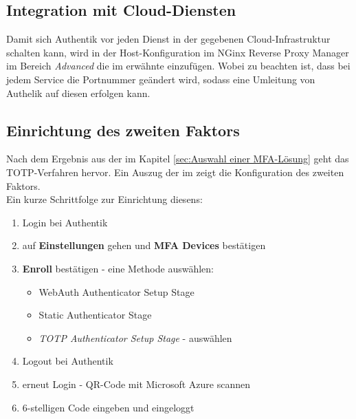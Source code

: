 \subsection{Integration mit Cloud-Diensten}
\label{sec:Integration mit Cloud-Diensten}
Damit sich Authentik vor jeden Dienst in der gegebenen Cloud-Infrastruktur schalten kann, wird in der Host-Konfiguration im NGinx Reverse 
Proxy Manager im Bereich \textit{Advanced} die im  erwähnte  einzufügen. Wobei zu beachten ist, 
dass bei jedem Service die Portnummer geändert wird, sodass eine Umleitung von Authelik auf diesen erfolgen kann.

\subsection{Einrichtung des zweiten Faktors}
\label{sec:Einrichtung des zweiten Faktors}
Nach dem Ergebnis aus der  im Kapitel \ref{sec:Auswahl einer MFA-Lösung}  
geht das \acs{TOTP}-Verfahren hervor. Ein Auszug der  im  zeigt die Konfiguration des 
zweiten Faktors.
\\Ein kurze Schrittfolge zur Einrichtung diesens:
\begin{enumerate}
    \item Login bei Authentik
    \item auf \textbf{Einstellungen} gehen und \textbf{\acs*{MFA} Devices} bestätigen
    \item \textbf{Enroll} bestätigen - eine Methode auswählen:
    \begin{itemize}
        \item WebAuth Authenticator Setup Stage
        \item Static Authenticator Stage
        \item \textit{TOTP Authenticator Setup Stage} - auswählen
    \end{itemize}
   \item Logout bei Authentik
   \item erneut Login - QR-Code mit Microsoft Azure scannen
   \item 6-stelligen Code eingeben und eingeloggt
\end{enumerate}